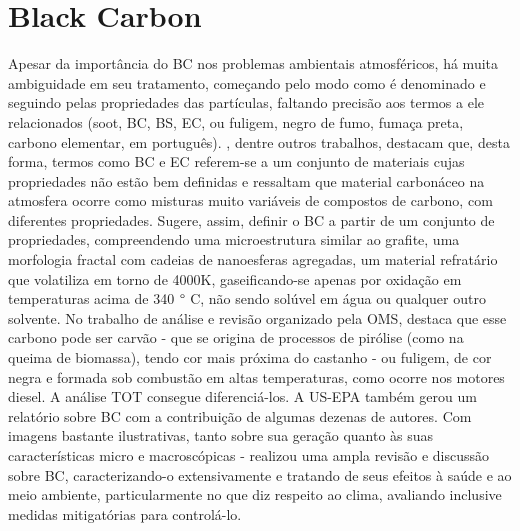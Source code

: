 \newpage
\section{Black Carbon}

Apesar da importância do BC nos problemas ambientais atmosféricos, há muita 
ambiguidade em seu tratamento, começando pelo modo como é denominado e seguindo
pelas propriedades das partículas, faltando precisão aos termos a ele 
relacionados (soot, BC, BS, EC, ou fuligem, negro de fumo, fumaça preta, 
carbono elementar, em português). \citet{petzold2013}, dentre outros trabalhos, 
destacam que, desta forma, termos como BC e EC referem-se a um conjunto de 
materiais cujas propriedades não estão bem definidas e ressaltam que material 
carbonáceo na atmosfera ocorre como misturas muito variáveis de compostos de 
carbono, com diferentes propriedades. Sugere, assim, definir o BC a partir de 
um conjunto de propriedades, compreendendo uma microestrutura similar ao grafite,
uma morfologia fractal com cadeias de nanoesferas agregadas, um material 
refratário que volatiliza em torno de 4000K, gaseificando-se apenas por oxidação
em temperaturas acima de 340 $\degree$ C, não sendo solúvel em água ou qualquer
outro solvente. No trabalho de análise e revisão organizado pela OMS, 
\citet{janssen2012} destaca que esse carbono pode ser carvão - que se origina
de processos de pirólise (como na queima de biomassa), tendo cor mais próxima do
castanho - ou fuligem, de cor negra e formada sob combustão em altas 
temperaturas, como ocorre nos motores diesel. A análise TOT consegue 
diferenciá-los. A US-EPA também gerou um relatório sobre BC \citep{epa2012} com
a contribuição de algumas dezenas de autores. Com imagens bastante ilustrativas, 
tanto sobre sua geração quanto às suas características micro e macroscópicas - 
realizou uma ampla revisão e 
discussão sobre BC, caracterizando-o extensivamente e tratando de seus efeitos 
à saúde e ao meio ambiente, particularmente no que diz respeito ao clima, 
avaliando inclusive medidas mitigatórias para controlá-lo. 

